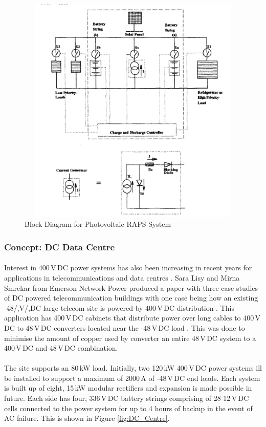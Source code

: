 \begin{figure}[H]
\hfill\includegraphics[width = 140mm, height = 110mm]{images/RAPS_Block}\hspace*{\fill}
\caption{{Block Diagram for Photovoltaic RAPS System \cite{Zahedi}}}
\label{fig:RAPS_Block}
\end{figure}        


\subsubsection{Concept: DC Data Centre}

\paragraph{}
Interest in 400\,V\,DC power systems has also been increasing in recent years for applications in telecommunications and data centres \cite{Lisy2015}. Sara Lisy and Mirna Smrekar from Emerson Network Power produced a paper with three case studies of DC powered telecommunication buildings with one case being how an existing -48/,V/,DC large telecom site is powered by 400\,V\,DC distribution \cite{Lisy2015}. This application has 400\,V\,DC cabinets that distribute power over long cables to 400\,V\,DC to 48\,V\,DC converters located near the -48\,V\,DC load \cite{Lisy2015}. This was done to minimise the amount of copper used by converter an entire 48\,V\,DC system to a 400\,V\,DC and 48\,V\,DC combination.

\paragraph{}
The site supports an 80\,kW load. Initially, two 120\,kW 400\,V\,DC power systems ill be installed to support a maximum of 2000\,A of -48\,V\,DC end loads. Each system is built up of eight, 15\,kW modular rectifiers and expansion is made possible in future. Each side has four, 336\,V\,DC battery strings comprising of 28 12\,V\,DC cells connected to the power system for up to 4 hours of backup in the event of AC failure. This is shown in Figure \ref{fig:DC_Centre}. 

